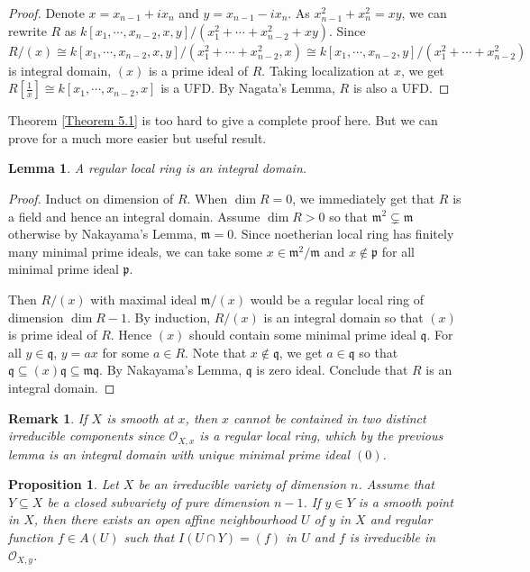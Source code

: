 \documentclass{ctexart}
\newtheorem{remark}{Remark}[section]
\newtheorem{proposition}{Proposition}[section]
\newtheorem{lemma}{Lemma}[section]
\begin{document}
\begin{proof}
    Denote $x = x_{n - 1} + ix_{n}$ and $y = x_{n - 1} - ix_{n}$.
    As $x_{n - 1}^{2} + x_{n}^{2} = xy$, we can rewrite $R$ as $k[x_{1}, \cdots, x_{n - 2}, x, y]/(x_{1}^{2} + \cdots + x_{n - 2}^{2} + xy)$.
    Since $R/(x) \cong k[x_{1}, \cdots, x_{n - 2}, x, y]/(x_{1}^{2} + \cdots + x_{n - 2}^{2}, x) \cong k[x_{1}, \cdots, x_{n - 2}, y]/(x_{1}^{2} + \cdots + x_{n - 2}^{2})$ is integral domain, $(x)$ is a prime ideal of $R$.
    Taking localization at $x$, we get $R[\frac{1}{x}] \cong k[x_{1}, \cdots, x_{n - 2}, x]$ is a UFD.
    By Nagata's Lemma, $R$ is also a UFD.
\end{proof}
Theorem \ref{Theorem 5.1} is too hard to give a complete proof here. 
But we can prove for a much more easier but useful result.
\begin{lemma}
    A regular local ring is an integral domain.
    \label{Lemma 5.7}
\end{lemma}
\begin{proof}
    Induct on dimension of $R$.
    When $\dim R = 0$, we immediately get that $R$ is a field and hence an integral domain.
    Assume $\dim R > 0$ so that $\mathfrak{m}^{2} \subsetneq \mathfrak{m}$ otherwise by Nakayama's Lemma, $\mathfrak{m} = 0$.
    Since noetherian local ring has finitely many minimal prime ideals, 
    we can take some $x\in \mathfrak{m}^{2}/\mathfrak{m}$ and $x\notin \mathfrak{p}$ for all minimal prime ideal $\mathfrak{p}$.
    \par
    Then $R/(x)$ with maximal ideal $\mathfrak{m}/(x)$ would be a regular local ring of dimension $\dim R - 1$.
    By induction, $R/(x)$ is an integral domain so that $(x)$ is prime ideal of $R$.
    Hence $(x)$ should contain some minimal prime ideal $\mathfrak{q}$.
    For all $y\in \mathfrak{q}$, $y = ax$ for some $a\in R$.
    Note that $x\notin \mathfrak{q}$, we get $a\in \mathfrak{q}$ so that $\mathfrak{q} \subseteq (x)\mathfrak{q} \subseteq \mathfrak{m}\mathfrak{q}$.
    By Nakayama's Lemma, $\mathfrak{q}$ is zero ideal.
    Conclude that $R$ is an integral domain.
\end{proof}
\begin{remark}
    If $X$ is smooth at $x$, then $x$ cannot be contained in two distinct irreducible components since $\mathcal{O}_{X, x}$ is a regular local ring,
    which by the previous lemma is an integral domain with unique minimal prime ideal $(0)$.
\end{remark}
\begin{proposition}
    Let $X$ be an irreducible variety of dimension $n$.
    Assume that $Y \subseteq X$ be a closed subvariety of pure dimension $n - 1$.
    If $y\in Y$ is a smooth point in $X$, 
    then there exists an open affine neighbourhood $U$ of $y$ in $X$ and regular function $f\in A(U)$ such that $I(U \cap Y) = (f)$ in $U$ and $f$ is irreducible in $\mathcal{O}_{X, y}$. 
    \label{Proposition 5.3}
\end{proposition}
\end{document}
